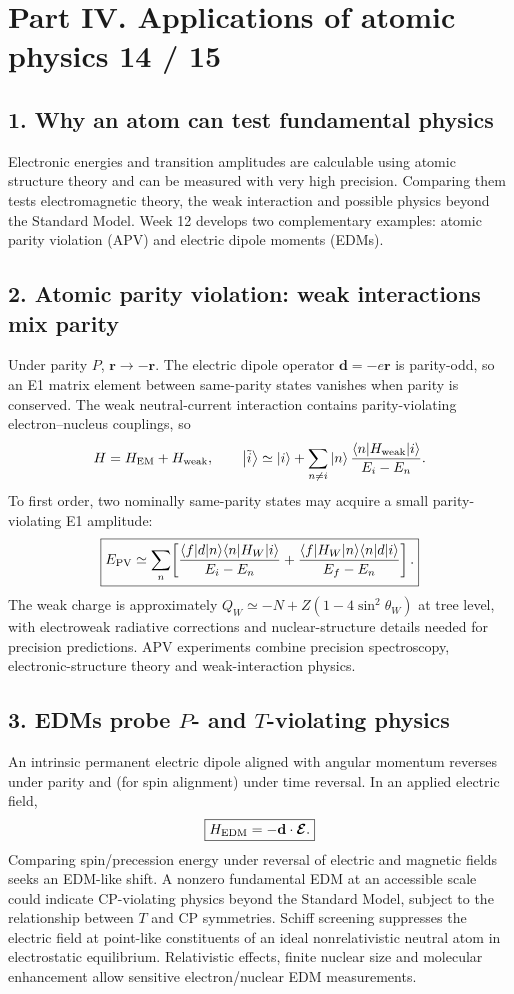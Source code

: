 
\section*{Part IV. Applications of atomic physics \hfill 14 / 15}
\subsection*{1. Why an atom can test fundamental physics}
Electronic energies and transition amplitudes are calculable
using atomic structure theory and can be measured with very
high precision. Comparing them tests electromagnetic theory,
the weak interaction and possible physics beyond the Standard
Model. Week 12 develops two complementary examples:
atomic parity violation (APV) and electric dipole moments (EDMs).

\subsection*{2. Atomic parity violation: weak interactions mix parity}
Under parity \(P\), \(\mathbf r\to-\mathbf r\).
The electric dipole operator \(\mathbf d=-e\mathbf r\) is
parity-odd, so an E1 matrix element between same-parity
states vanishes when parity is conserved.
The weak neutral-current interaction contains
parity-violating electron--nucleus couplings, so
\[
H=H_{\rm EM}+H_{\rm weak},\qquad
\left\lvert \tilde i\right\rangle\simeq\left\lvert i\right\rangle+
\sum_{n\ne i}\left\lvert n\right\rangle
\frac{\langle n|H_{\rm weak}|i\rangle}{E_i-E_n}.
\]
To first order, two nominally same-parity states may acquire
a small parity-violating E1 amplitude:
\[
\boxed{E_{\rm PV}\simeq
\sum_n\!\left[
\frac{\langle f|d|n\rangle\langle n|H_W|i\rangle}{E_i-E_n}
+\frac{\langle f|H_W|n\rangle\langle n|d|i\rangle}{E_f-E_n}
\right].}
\]
The weak charge is approximately
\(Q_W\simeq -N+Z(1-4\sin^2\theta_W)\)
at tree level, with electroweak radiative corrections and
nuclear-structure details needed for precision predictions.
APV experiments combine precision spectroscopy,
electronic-structure theory and weak-interaction physics.

\subsection*{3. EDMs probe \(P\)- and \(T\)-violating physics}
An intrinsic permanent electric dipole aligned with angular
momentum reverses under parity and (for spin alignment)
under time reversal. In an applied electric field,
\[
\boxed{H_{\rm EDM}=-\mathbf d\cdot\boldsymbol{\mathcal E}.}
\]
Comparing spin/precession energy under reversal of
electric and magnetic fields seeks an EDM-like shift.
A nonzero fundamental EDM at an accessible scale
could indicate CP-violating physics beyond the Standard Model,
subject to the relationship between \(T\) and CP symmetries.
Schiff screening suppresses the electric field at
point-like constituents of an ideal nonrelativistic neutral
atom in electrostatic equilibrium. Relativistic effects,
finite nuclear size and molecular enhancement allow
sensitive electron/nuclear EDM measurements.

